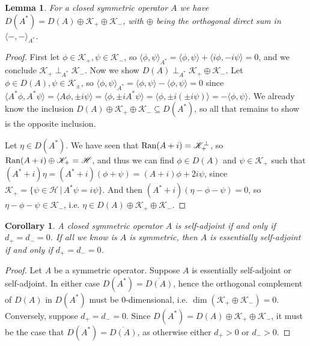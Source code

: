 \documentclass[12pt,oneside]{report}
\newtheorem{cor}[thm]{Corollary}
\newtheorem{lem}[thm]{Lemma}
\begin{document}
\begin{lem}
    For a closed symmetric operator $A$ we have $D(A^{*}) = D(A) \oplus \mathscr{K}_{+} \oplus \mathscr{K}_{-}$, with $\oplus$ being the orthogonal direct sum in $\langle -,- \rangle_{A^{*}}$.
\end{lem}
\begin{proof}
    First let $\phi \in \mathscr{K}_{+}, \psi \in \mathscr{K}_{-}$, so $\langle \phi,\psi \rangle_{A^{*}} = \langle \phi, \psi \rangle + \langle i\phi, -i\psi \rangle = 0$, and we conclude $\mathscr{K}_{+} \perp_{A^{*}} \mathscr{K}_{-}$. Now we show $D(A) \perp_{A^{*}} \mathscr{K}_{+} \oplus \mathscr{K}_{-}$. Let $\phi \in D(A), \psi \in \mathscr{K}_{\pm}$, so $\langle \phi, \psi \rangle_{A^{*}} = \langle \phi,\psi \rangle - \langle \phi,\psi \rangle = 0$ since $\langle A^{*}\phi, A^{*}\psi \rangle = \langle A\phi, \pm i\psi \rangle = \langle \phi, \pm i A^{*}\psi \rangle = \langle \phi, \pm i (\pm i \psi) \rangle = -\langle\phi, \psi \rangle$. We already know the inclusion $D(A) \oplus \mathscr{K}_{+} \oplus \mathscr{K}_{-} \subseteq D(A^{*})$, so all that remains to show is the opposite inclusion.

    Let $\eta \in D(A^{*})$. We have seen that $\mathrm{Ran}(A + i) = \mathscr{K}_{+}^{\perp}$, so $\mathrm{Ran}(A + i) \oplus \mathscr{K}_{+} = \mathscr{H}$, and thus we can find $\phi \in D(A)$ and $\psi \in \mathscr{K}_{+}$ such that $(A^{*}+i)\eta = (A^{*}+i)(\phi + \psi) = (A+i)\phi + 2i\psi$, since $\mathscr{K}_{+} = \{ \psi \in \mathscr{H} \, | \, A^{*}\psi = i \psi \}$. And then $(A^{*} + i)(\eta-\phi-\psi) = 0$, so $\eta - \phi - \psi \in \mathscr{K}_{-}$, i.e. $\eta \in D(A) \oplus \mathscr{K}_{+} \oplus \mathscr{K}_{-}$.
\end{proof}

\begin{cor}
    A closed symmetric operator $A$ is self-adjoint if and only if $d_{+} = d_{-} = 0$. If all we know is $A$ is symmetric, then $A$ is essentially self-adjoint if and only if $d_{+} = d_{-} = 0$.
\end{cor}
\begin{proof}
    Let $A$ be a symmetric operator. Suppose $A$ is essentially self-adjoint or self-adjoint. In either case $D(A^{*}) = \overline{D(A)}$, hence the orthogonal complement of $D(A)$ in $D(A^{*})$ must be $0$-dimensional, i.e. $\dim(\mathscr{K}_{+} \oplus \mathscr{K}_{-}) = 0$. Conversely, suppose $d_{+} = d_{-} = 0$. Since $D(A^{*}) = D(A) \oplus \mathscr{K}_{+} \oplus \mathscr{K}_{-}$, it must be the case that $D(A^{*}) = \overline{D(A)}$, as otherwise either $d_{+} > 0$ or $d_{-} > 0$.
\end{proof}
\end{document}
